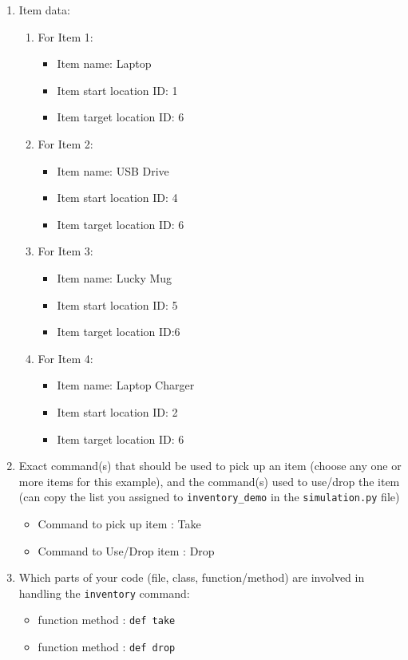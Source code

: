 \documentclass[11pt]{article}
\begin{document}
\begin{enumerate}
\item Item data:
\begin{enumerate}
    \item For Item 1:
    \begin{itemize}
    \item Item name: Laptop
    \item Item start location ID: 1
    \item Item target location ID: 6
    \end{itemize}
        \item For Item 2:
    \begin{itemize}
    \item Item name: USB Drive
    \item Item start location ID: 4
    \item Item target location ID: 6
    \end{itemize}
        \item For Item 3:
    \begin{itemize}
    \item Item name: Lucky Mug
    \item Item start location ID: 5
    \item Item target location ID:6
    \end{itemize}
        \item For Item 4:
    \begin{itemize}
    \item Item name: Laptop Charger
    \item Item start location ID: 2
    \item Item target location ID: 6
    \end{itemize}
\end{enumerate}

    \item Exact command(s) that should be used to pick up an item (choose any one or more items for this example), and the command(s) used to use/drop the item (can copy the list you assigned to
    \texttt{inventory\_demo} in the \texttt{simulation.py} file)
        \begin{itemize}
            \item Command to pick up item : Take
            \item Command to Use/Drop item : Drop
        \end{itemize}


    \item Which parts of your code (file, class, function/method) are involved in handling the \texttt{inventory} command:
    \begin{itemize}
        \item function method : \texttt{def take}
        \item function method : \texttt{def drop}
    \end{itemize}
\end{enumerate}
\end{document}
